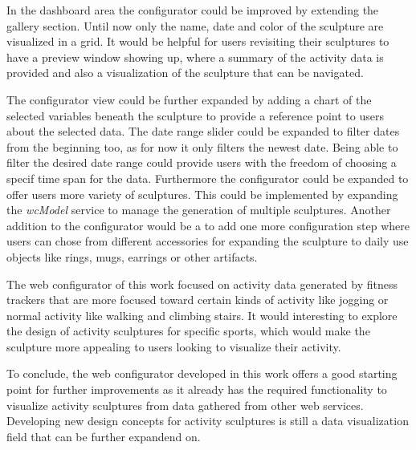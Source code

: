 \documentclass[../medieninformatik-arbeit.tex]{subfiles}
\begin{document}
In the dashboard area the configurator could be improved by extending the gallery section. Until now only the name, date and color of the sculpture are visualized in a grid. It would be helpful for users revisiting their sculptures to have a preview window showing up, where a summary of the activity data is provided and also a visualization of the sculpture that can be navigated. 

The configurator view could be further expanded by adding a chart of the selected variables beneath the sculpture to provide a reference point to users about the selected data. The date range slider could be expanded to filter dates from the beginning too, as for now it only filters the newest date. Being able to filter the desired date range could provide users with the freedom of choosing a specif time span for the data. Furthermore the configurator could be expanded to offer users more variety of sculptures. This could be implemented by expanding the \textit{wcModel} service to manage the generation of multiple sculptures. Another addition to the configurator would be a to add one more configuration step where users can chose from different accessories for expanding the sculpture to daily use objects like rings, mugs, earrings or other artifacts. 

The web configurator of this work focused on activity data generated by fitness trackers that are more focused toward certain kinds of activity like jogging or normal activity like walking and climbing stairs. It would interesting to explore the design of activity sculptures for specific sports, which would make the sculpture more appealing to users looking to visualize their activity.

To conclude, the web configurator developed in this work offers a good starting point for further improvements as it already has the required functionality to visualize activity sculptures from data gathered from other web services. Developing new design concepts for activity sculptures is still a data visualization field that can be further expandend on.
\end{document}
